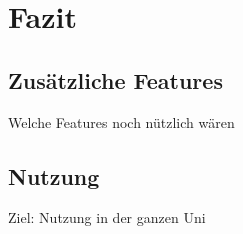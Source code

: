 \chapter{Fazit}\label{Fazit}
% 


% 
\section{Zusätzliche Features}\label{Zusätzliche Features}
Welche Features noch nützlich wären





\section{Nutzung}\label{Nutzung}
Ziel: Nutzung in der ganzen Uni


